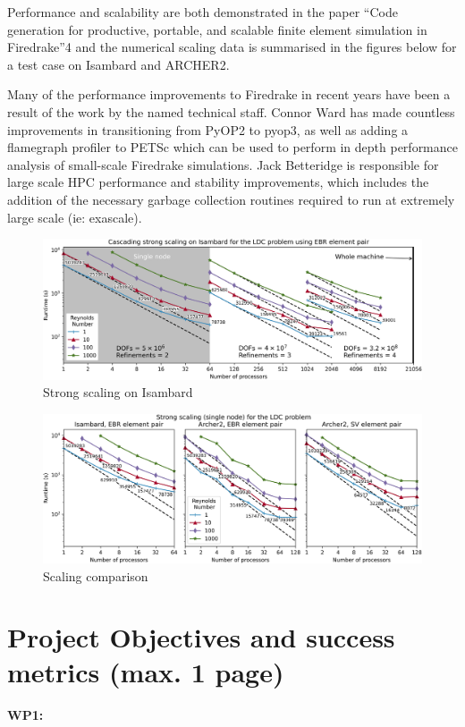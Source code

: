 \documentclass[a4paper,11pt]{article}
\begin{document}
Performance and scalability are both demonstrated in the paper ``Code generation for productive, portable, and scalable finite element simulation in Firedrake''4 and the numerical scaling data is summarised in the figures below for a test case on Isambard and ARCHER2. 

Many of the performance improvements to Firedrake in recent years have been a result of the work by the named technical staff.
Connor Ward has made countless improvements in transitioning from PyOP2 to pyop3, as well as adding a flamegraph profiler to PETSc which can be used to perform in depth performance analysis of small-scale Firedrake simulations.
Jack Betteridge is responsible for large scale HPC performance and stability improvements, which includes the addition of the necessary garbage collection routines required to run at extremely large scale (ie: exascale).

\begin{figure}
    \centering
    \includegraphics[width=\textwidth]{isambard.png}
    \caption{Strong scaling on Isambard}
\end{figure}

\begin{figure}
	\centering
	\includegraphics[width=\textwidth]{archer2.png}
	\caption{Scaling comparison}
\end{figure}


\clearpage
\section{Project Objectives and success metrics (max. 1 page)}
\noindent\textbf{WP1:}
\end{document}
